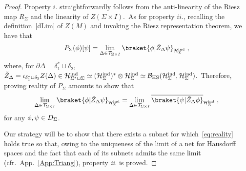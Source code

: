 \documentclass[11pt]{article}
\newcommand{\be}{\begin{equation}}
\newcommand{\ee}{\end{equation}}
\newcommand{\Hil}{\mathcal{H}}
\newcommand{\cD}{\mathcal{D}}
\newcommand{\Hind}{\mathcal{H}_{\Sigma}^{\rm ind}}
\newcommand{\del}{\partial}
\theoremstyle{definition}
\numberwithin{equation}{section}
\begin{document}
\begin{proof}
    Property $i.$ straightforwardly follows from the anti-linearity of the Riesz map $R_{\Sigma}$ and the linearity of $Z(\Sigma\times I)$.~As for property $ii.$, recalling the definition~\eqref{dLim} of $Z(M)$ and invoking the Riesz representation theorem, we have that
    \be
    P_{\Sigma}(\phi)[\psi]=\lim_{\Delta\in\mathcal{T}_{\Sigma\times I}}\braket{\phi|\tilde{Z}_{\Delta}\psi}_{\Hind}\;,
    \ee
    where, for $\del\Delta=\delta_1^*\sqcup\delta_2$, $\tilde{Z}_{\Delta}=\iota_{\delta_1^*\sqcup\delta_2}Z(\Delta)\in\Hil_{\Sigma^*\sqcup\Sigma}^{\rm ind}\simeq(\Hind)^*\otimes\Hind\simeq\mathcal B_{\rm HS}(\Hind,\Hind)$.~Therefore, proving reality of $P_{\Sigma}$ amounts to show that
    \be\label{eq:reality}
    \lim_{\Delta\in\mathcal{T}_{\Sigma\times I}}\braket{\phi|\tilde{Z}_{\Delta}\psi}_{\Hind}=\lim_{\Delta\in\mathcal{T}_{\Sigma\times I}}\overline{\braket{\psi|\tilde{Z}_{\Delta}\phi}}_{\Hind}\;,
    \ee
for any $\phi,\psi\in\mathcal \cD_{\Sigma}$.

Our strategy will be to show that there exists a subnet for which~\eqref{eq:reality} holds true so that, owing to the uniqueness of the limit of a net for Hausdorff spaces and the fact that each of its subnets admits the same limit (cfr.~App.~\ref{App:Triang}), property \textit{ii.} is proved.


\end{proof}
\end{document}
